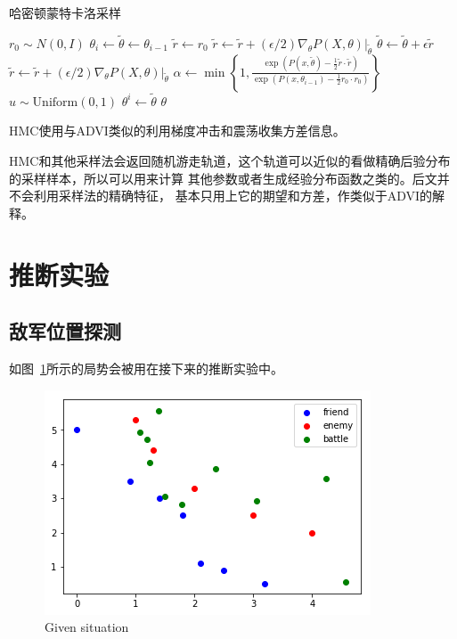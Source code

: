 \documentclass{sicnuthesis}
\begin{document}
\begin{algorithm}
\caption{哈密顿蒙特卡洛采样}
\begin{algorithmic}[1]
 
        \State $r_0 \sim N(0,I)$
        \State $\theta_i \gets \tilde{\theta} \gets \theta_{i-1}$
        \State $\tilde{r} \gets r_0$
         
            \State $\tilde{r} \gets \tilde{r} + (\epsilon/2) \nabla_\theta P(X,\theta)|_{\tilde{\theta}}$
            \State $\tilde{\theta} \gets \tilde{\theta} + \epsilon \tilde{r}$
            \State $\tilde{r} \gets \tilde{r} + (\epsilon/2) \nabla_\theta P(X,\theta)|_{\tilde{\theta}}$
        \EndFor
        \State $\alpha \gets \min \left\{ 1, \frac{\exp(P(x,\tilde{\theta})-\frac{1}{2}\tilde{r}\cdot\tilde{r})}{\exp(P(x,\theta_{i-1})-\frac{1}{2}r_0\cdot r_0)} \right\}$  
        \State $u \sim \mathrm{Uniform}(0,1)$
            \State $\theta^i \gets \tilde{\theta}$
        \EndIf
    \EndFor
    \State \Return $\theta$
\EndProcedure
\end{algorithmic}
\label{alg:hmc}
\end{algorithm}


HMC使用与ADVI类似的利用梯度冲击和震荡收集方差信息。

HMC和其他采样法会返回随机游走轨道，这个轨道可以近似的看做精确后验分布的采样样本，所以可以用来计算
其他参数或者生成经验分布函数之类的。后文并不会利用采样法的精确特征，
基本只用上它的期望和方差，作类似于ADVI的解释。

\section{推断实验}

\subsection{敌军位置探测}


如图~\ref{fig:expState}所示的局势会被用在接下来的推断实验中。

\begin{figure}[htb]
\includegraphics[width=0.6\linewidth]{exp_state.png}
\caption{Given situation}
\label{fig:expState}
\end{figure}
\end{document}
